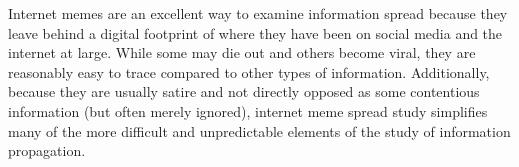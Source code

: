 Internet memes are an excellent way to examine information spread because they leave behind a digital footprint of where they have been on social media and the internet at large. While some may die out and others become viral, they are reasonably easy to trace compared to other types of information. Additionally, because they are usually satire and not directly opposed as some contentious information (but often merely ignored), internet meme spread study simplifies many of the more difficult and unpredictable elements of the study of information propagation.